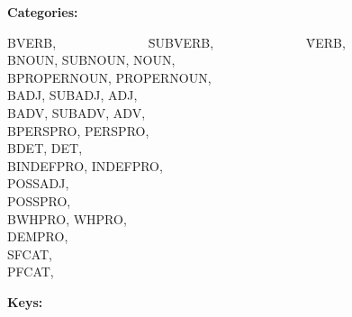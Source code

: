 {\bf Categories:}

\begin{tabbing}
BVERB, \ \ \ \ \ \ \ \ \ \ \ \ \ \  \=   SUBVERB,  \ \ \ \ \ \ \ \ \ \ \ \ \ \ 
 \=   VERB,  \\ 
BNOUN,       \>   SUBNOUN,      \>   NOUN,  \\ 
BPROPERNOUN, \>   PROPERNOUN,   \>          \\
BADJ,        \>  SUBADJ,        \>   ADJ,   \\  
BADV,        \>  SUBADV,        \>   ADV,   \\
BPERSPRO,    \>  PERSPRO,       \>          \\
BDET,        \>    DET,         \>          \\ 
BINDEFPRO,   \>  INDEFPRO,      \>          \\
POSSADJ,     \>  \>  \\ 
POSSPRO,     \>  \>  \\ 
BWHPRO,      \>  WHPRO,         \>          \\
DEMPRO,      \>  \>  \\
SFCAT,       \>  \>  \\ 
PFCAT,       \>  \>  \\ 
\end{tabbing}

{\bf Keys:}

